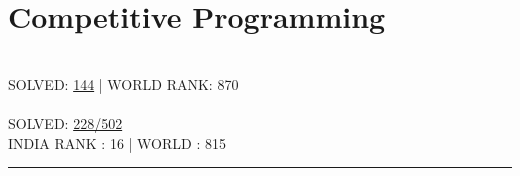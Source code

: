 \documentclass[letterpaper]{Formatting}
\begin{document}
\begin{minipage}[t]{0.3\textwidth}
\section{Competitive Programming}
\\\vspace{0.5ex}
\small\uppercase {Solved: }\href{http://www.spoj.com/users/rbavishi/}{144} | \uppercase{World Rank: 870}\\
\vspace{2ex}
\\\vspace{0.5ex}
\small \uppercase{Solved: }\href{https://projecteuler.net/profile/RJBavishi.png}{228/502} \\
\small \uppercase{India Rank : 16 | World : 815}
\vspace{1ex}
\rule{5cm}{0.5pt}
\vspace{2ex}


\end{minipage} %
\hfill
\vrule
\hspace{3ex}
%
%
\end{document}
